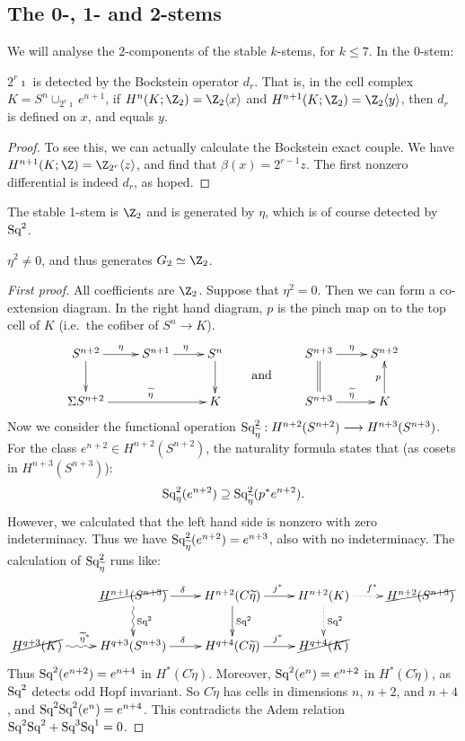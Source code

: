 \documentclass[11pt]{article}
\begin{document}
\subsection{The 0-, 1- and 2-stems}
We will analyse the $2$-components of the stable $k$-stems, for $k\leq7$. In the
$0$-stem:
\begin{prop*}[1]
$2^r\imath$ is detected by the Bockstein operator $d_r$. That is, in the cell
complex $K=S^n\cup_{2^r\imath}e^{n+1}$, if $H^{n}(K;\Z_2)=\Z_2\langle x\rangle$
and $H^{n+1}(K;\Z_2)=\Z_2\langle y\rangle$, then $d_r$ is defined on $x$, and
equals $y$.
\end{prop*}
\begin{proof}
To see this, we can actually calculate the Bockstein exact couple. We have
$H^{n+1}(K;\Z)=\Z_{2^r}\langle z\rangle$, and find that $\beta(x)=2^{r-1}z$. The
first nonzero differential is indeed $d_r$, as hoped.
\end{proof}
The stable 1-stem is $\Z_2$ and is generated by $\eta$, which is of course
detected by $\textup{Sq}^2$.
\begin{prop*}[2]
$\eta^2\neq0$, and thus generates $G_2\simeq\Z_2$.
\end{prop*}
\begin{proof}[First proof]
All coefficients are $\Z_2$. Suppose that $\eta^2=0$. Then we can form a
co-extension diagram. In the right hand diagram, $p$ is the pinch map on to the
top cell of $K$ (i.e.\ the cofiber of $S^n\to K$).
\[\xymatrix{
S^{n+2}\ar[d]\ar[r]^\eta&S^{n+1}\ar[r]^\eta&S^n\ar[d]\\
\Sigma S^{n+2}\ar[rr]^{\widetilde \eta}&&K
}
\raisebox{-.6cm}{\text{\qquad and \qquad}}
\xymatrix{
S^{n+3}\ar[r]^\eta&S^{n+2}\\
S^{n+3}\ar[r]^{\widetilde\eta}\ar@{=}[u]&K\ar[u]^p
}\]
Now we consider the functional operation 
$\textup{Sq}^2_{\widetilde\eta}:H^{n+2}(S^{n+2})\longrightarrow H^{n+3}(S^{n+3})$.
For the class $e^{n+2}\in H^{n+2}(S^{n+2})$, the naturality formula states
that (as cosets in $H^{n+3}(S^{n+3})$):
\[\textup{Sq}^2_\eta(e^{n+2})\supseteq\textup{Sq}^2_{\widetilde\eta}(p^*e^{n+2}).\]
However, we calculated that the left hand side is nonzero with zero 
indeterminacy. Thus we have $\textup{Sq}^2_{\widetilde\eta}(e^{n+2})=e^{n+3}$, also 
with no indeterminacy. The calculation of $\textup{Sq}^2_{\widetilde\eta}$ runs like:
\[\xymatrix{
&\cancel{H^{n+1}(S^{n+3})}\ar[r]^\delta\ar@{~>}[d]^{\Squ^2}&
H^{n+2}(C\widetilde\eta)\ar[r]^{j^*}\ar[d]^{\Squ^2}&
H^{n+2}(K)\ar@{.>}[r]^{f^*}\ar@{.>}[d]^{\Squ^2}&
\cancel{H^{n+2}(S^{n+3})}\\
\cancel{H^{q+3}(K)}\ar@{~>}[r]^{\widetilde\eta^*}&
H^{q+3}(S^{n+3})\ar[r]^\delta&
H^{q+4}(C\widetilde\eta)\ar[r]^{j^*}&
\cancel{H^{q+4}(K)}
}\]
Thus $\textup{Sq}^2(e^{n+2})=e^{n+4}$ in $H^*(C\widetilde\eta)$. Moreover,
$\textup{Sq}^2(e^{n})=e^{n+2}$ in $H^*(C\widetilde\eta)$, as $\textup{Sq}^2$ detects odd Hopf
invariant. So $C\widetilde\eta$ has cells in dimensions $n$, $n+2$, and $n+4$,
and $\textup{Sq}^2\textup{Sq}^2(e^n)=e^{n+4}$. This contradicts the Adem relation
$\textup{Sq}^2\textup{Sq}^2+\textup{Sq}^3\textup{Sq}^1=0$.
\end{proof}
\end{document}
